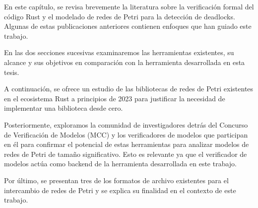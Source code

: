En este capítulo, se revisa brevemente la literatura sobre la verificación formal del código Rust
y el modelado de redes de Petri para la detección de deadlocks. Algunas de estas publicaciones
anteriores contienen enfoques que han guiado este trabajo.

En las dos secciones sucesivas examinaremos las herramientas existentes, su alcance y sus
objetivos en comparación con la herramienta desarrollada en esta tesis.

A continuación, se ofrece un estudio de las bibliotecas de redes de Petri existentes en el
ecosistema Rust a principios de 2023 para justificar la necesidad de implementar una biblioteca
desde cero.

Posteriormente, exploramos la comunidad de investigadores detrás del Concurso
de Verificación de Modelos (\acrfull{MCC}) y los verificadores de modelos que participan en él
para confirmar el potencial de estas herramientas para analizar modelos de redes de Petri de
tamaño significativo. Esto es relevante ya que el verificador de modelos actúa como backend
de la herramienta desarrollada en este trabajo.

Por último, se presentan tres de los formatos de archivo existentes para el intercambio de redes
de Petri y se explica su finalidad en el contexto de este trabajo.